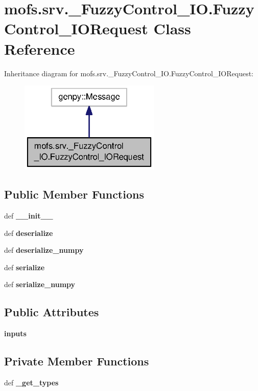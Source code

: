 \section{mofs.\-srv.\-\_\-\-Fuzzy\-Control\-\_\-\-I\-O.\-Fuzzy\-Control\-\_\-\-I\-O\-Request Class Reference}
\label{classmofs_1_1srv_1_1__FuzzyControl__IO_1_1FuzzyControl__IORequest}


Inheritance diagram for mofs.\-srv.\-\_\-\-Fuzzy\-Control\-\_\-\-I\-O.\-Fuzzy\-Control\-\_\-\-I\-O\-Request\-:\nopagebreak
\begin{figure}[H]
\begin{center}
\leavevmode
\includegraphics[width=190pt]{classmofs_1_1srv_1_1__FuzzyControl__IO_1_1FuzzyControl__IORequest__inherit__graph}
\end{center}
\end{figure}
\subsection*{Public Member Functions}
\begin{DoxyCompactItemize}
\item 
def {\bf \-\_\-\-\_\-init\-\_\-\-\_\-}
\item 
def {\bf deserialize}
\item 
def {\bf deserialize\-\_\-numpy}
\item 
def {\bf serialize}
\item 
def {\bf serialize\-\_\-numpy}
\end{DoxyCompactItemize}
\subsection*{Public Attributes}
\begin{DoxyCompactItemize}
\item 
{\bf inputs}
\end{DoxyCompactItemize}
\subsection*{Private Member Functions}
\begin{DoxyCompactItemize}
\item 
def {\bf \-\_\-get\-\_\-types}
\end{DoxyCompactItemize}
